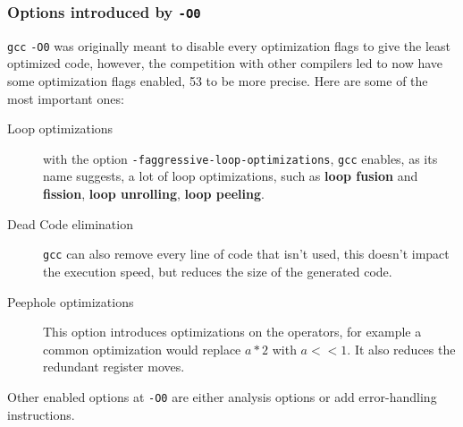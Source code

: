 \documentclass{rapport}
\newcommand{\gcc}{\texttt{gcc} }
\newcommand{\optizero}{\texttt{-O0} }
\begin{document}
\subsubsection{Options introduced by \optizero}
\gcc \optizero was originally meant to disable every optimization flags to give the least optimized code, however, the competition with other compilers led to now have some optimization flags enabled, 53 to be more precise. Here are some of the most important ones:
\newline
\begin{description}
    \item[Loop optimizations] with the option \texttt{-faggressive-loop-optimizations}, \gcc enables, as its name suggests, a lot of loop optimizations, such as \textbf{loop fusion} and \textbf{fission}, \textbf{loop unrolling}, \textbf{loop peeling}.
    \item[Dead Code elimination] \gcc can also remove every line of code that isn't used, this doesn't impact the execution speed, but reduces the size of the generated code.
    \item[Peephole optimizations] This option introduces optimizations on the operators, for example a common optimization would replace $a*2$ with $a<<1$. It also reduces the redundant register moves.
\end{description}
Other enabled options at \optizero are either analysis options or add error-handling instructions.
\end{document}

